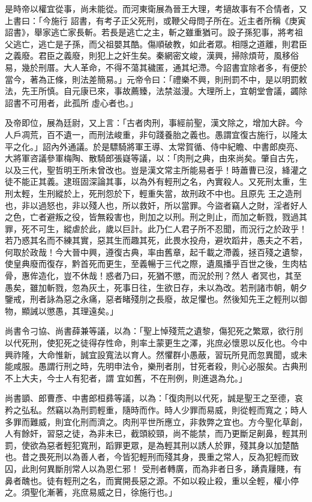 \begin{pinyinscope}
 是時帝以權宜從事，尚未能從。而河東衛展為晉王大理，考擿故事有不合情者，又上書曰：「今施行
 詔書，有考子正父死刑，或鞭父母問子所在。近主者所稱《庚寅詔書》，舉家逃亡家長斬。若長是逃亡之主，斬之雖重猶可。設子孫犯事，將考祖父逃亡，逃亡是子孫，而父祖嬰其酷。傷順破教，如此者眾。相隱之道離，則君臣之義廢。君臣之義廢，則犯上之奸生矣。秦網密文峻，漢興，掃除煩苛，風移俗易，幾於刑厝。大人革命，不得不蕩其穢匿，通其圮滯。今詔書宜除者多，有便於當今，著為正條，則法差簡易。」元帝令曰：「禮樂不興，則刑罰不中，是以明罰敕法，先王所慎。自元康已來，事故薦臻，法禁滋漫。大理所上，宜朝堂會議，蠲除詔書不可用者，此孤所
 虛心者也。」



 及帝即位，展為廷尉，又上言：「古者肉刑，事經前聖，漢文除之，增加大辟。今人戶凋荒，百不遺一，而刑法峻重，非句踐養胎之義也。愚謂宜復古施行，以隆太平之化。」詔內外通議。於是驃騎將軍王導、太常賀循、侍中紀瞻、中書郎庾亮、大將軍咨議參軍梅陶、散騎郎張嶷等議，以：「肉刑之典，由來尚矣。肇自古先，以及三代，聖哲明王所未曾改也。豈是漢文常主所能易者乎！時蕭曹已沒，絳灌之徒不能正其義。逮班固深論其事，以為外有輕刑之名，內實殺人。又死刑太重，生刑太輕，生刑縱於上，死刑怨於下，輕重失當，故刑政不中也。且原先
 王之造刑也，非以過怒也，非以殘人也，所以救奸，所以當罪。今盜者竊人之財，淫者好人之色，亡者避叛之役，皆無殺害也，則加之以刑。刑之則止，而加之斬戮，戮過其罪，死不可生，縱虐於此，歲以巨計。此乃仁人君子所不忍聞，而況行之於政乎！若乃惑其名而不練其實，惡其生而趣其死，此畏水投舟，避坎蹈井，愚夫之不若，何取於政哉！今大晉中興，遵復古典，率由舊章，起千載之滯義，拯百殘之遺黎，使皇典廢而復存，黔首死而更生，至義暢于三代之際，遺風播乎百世之後，生肉枯骨，惠侔造化，豈不休哉！惑者乃曰，死猶不懲，而況於刑？然人
 者冥也，其至愚矣，雖加斬戮，忽為灰土，死事日往，生欲日存，未以為改。若刑諸市朝，朝夕鑒戒，刑者詠為惡之永痛，惡者睹殘刖之長廢，故足懼也。然後知先王之輕刑以御物，顯誡以懲愚，其理遠矣。」



 尚書令刁協、尚書薛兼等議，以為：「聖上悼殘荒之遺黎，傷犯死之繁眾，欲行刖以代死刑，使犯死之徒得存性命，則率土蒙更生之澤，兆庶必懷恩以反化也。今中興祚隆，大命惟新，誠宜設寬法以育人。然懼群小愚蔽，習玩所見而忽異聞，或未能咸服。愚謂行刑之時，先明申法令，樂刑者刖，甘死者殺，則心必服矣。古典刑不上大夫，今士人有犯者，謂
 宜如舊，不在刑例，則進退為允。」



 尚書顗、郎曹彥、中書郎桓彞等議，以為：「復肉刑以代死，誠是聖王之至德，哀矜之弘私。然竊以為刑罰輕重，隨時而作。時人少罪而易威，則從輕而寬之；時人多罪而難威，則宜化刑而濟之。肉刑平世所應立，非救弊之宜也。方今聖化草創，人有餘奸，習惡之徒，為非未已，截頭絞頸，尚不能禁，而乃更斷足劓鼻，輕其刑罰，使欲為惡者輕犯寬刑，蹈罪更眾，是為輕其刑以誘人於罪，殘其身以加楚酷也。昔之畏死刑以為善人者，今皆犯輕刑而殘其身，畏重之常人，反為犯輕而致囚，此則何異斷刖常人以為恩仁邪！
 受刑者轉廣，而為非者日多，踴貴屨賤，有鼻者醜也。徒有輕刑之名，而實開長惡之源。不如以殺止殺，重以全輕，權小停之。須聖化漸著，兆庶易威之日，徐施行也。」




\end{pinyinscope}
